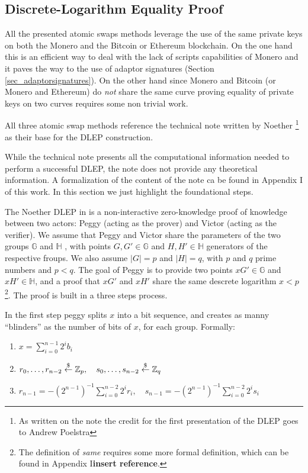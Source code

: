 \documentclass[runningheads]{llncs}
\newcommand{\getsrandom}{\overset{\tiny{\$}}{\leftarrow}}
\newcommand{\ggroup}{\mathbb{G}}
\newcommand{\hgroup}{\mathbb{H}}
\newcommand{\ggrouptxt}{$\mathbb{G}$ }
\newcommand{\hgrouptxt}{$\mathbb{H}$ }
\newcommand{\Zp}{\mathbb{Z}_p}
\newcommand{\Zq}{\mathbb{Z}_q}
\begin{document}
\subsection{Discrete-Logarithm Equality Proof} \label{sec_dlep}

All the presented atomic swaps methods leverage the use of the same private keys on both the Monero and the Bitcoin or Ethereum blockchain. On the one hand this is an efficient way to deal with the lack of scripts capabilities of Monero and it paves the way to the use of adaptor signatures (Section \ref{sec_adaptorsignatures}). On the other hand since Monero and Bitcoin (or Monero and Ethereum) do \emph{not} share the same curve proving equality of private keys on two curves requires some non trivial work.

All three atomic swap methods reference the technical note written by Noether \footnote{As written on the note the credit for the first presentation of the DLEP goes to Andrew Poelstra} \cite{dlep} as their base for the DLEP construction.

While the technical note presents all the computational information needed to perform a successful DLEP, the note does not provide any theoretical information. A formalization of the content of the note ca be found in Appendix I of this work. In this section we just highlight the foundational steps.

The Noether DLEP in \cite{dlep} is a non-interactive zero-knowledge proof of knowledge between two actors: Peggy (acting as the prover) and Victor (acting as the verifier). We assume that Peggy and Victor share the parameters of the two groups \ggrouptxt and \hgrouptxt, with points $G,G'\in\ggroup$ and $H,H' \in\hgroup$ generators of the respective froups. We also assume $|G|=p$ and $|H|=q$, with $p$ and $q$ prime numbers and $p<q$. The goal of Peggy is to provide two points $xG'\in\ggroup$ and $xH'\in\hgroup$, and a proof that $xG'$ and $xH'$ share the same descrete logarithm $x<p$\footnote{The definition of \emph{same} requires some more formal definition, which can be found in Appendix I\textbf{insert reference}.}. The proof is built in a three steps process.

In the first step peggy splits $x$ into a bit sequence, and creates as manny ``blinders'' as the number of bits of $x$, for each group. Formally:
\begin{enumerate}
    \item $x=\sum_{i=0}^{n-1} 2^ib_i$
    \item $r_0,\dots,r_{n-2}\getsrandom\Zp,\quad s_0,\dots,s_{n-2}\getsrandom\Zq$
    \item $r_{n-1}=-(2^{n-1})^{-1}\sum_{i=0}^{n-2} 2^ir_i,\quad s_{n-1}=-(2^{n-1})^{-1}\sum_{i=0}^{n-2} 2^is_i$
\end{enumerate}
\end{document}
